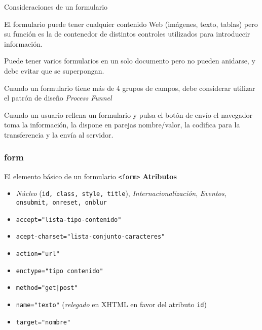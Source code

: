 \documentclass{beamer}
\begin{document}
\begin{frame}{Consideraciones de un formulario} %
    \begin{center}
        El formulario puede tener cualquier contenido Web (imágenes, texto,
        tablas) pero su función es la de contenedor de distintos controles
        utilizados para introduccir información. \\[0.4cm]
        \pause

        Puede tener varios formularios en un solo documento pero no pueden
        anidarse, y debe evitar que se superpongan. \\[0.4cm]
        \pause

        Cuando un formulario tiene más de 4 grupos de campos, debe considerar
        utilizar el patrón de diseño \textit{Process Funnel}\\[0.4cm]
        \pause

        Cuando un usuario rellena un formulario y pulsa el botón de envío el
        navegador toma la información,  la dispone en parejas nombre/valor, la
        codifica para la transferencia y la envía al servidor. 
    \end{center}
\end{frame}

\subsubsection{form} 

\begin{frame}{El elemento básico de un formulario \texttt{<form>} } %
    \textbf{Atributos}
    \begin{itemize}
        \item \textit{Núcleo} (\texttt{id, class, style, title}),
        \textit{Internacionalización}, \textit{Eventos}, \texttt{onsubmit,
        onreset, onblur}
        \item \texttt{accept="lista-tipo-contenido"}
        \item \texttt{acept-charset="lista-conjunto-caracteres"}
        \item \texttt{action="url"}
        \item \texttt{enctype="tipo contenido"}
        \item \texttt{method="get|post"}
        \item \texttt{name="texto"} (\textit{relegado} en XHTML en favor del
        atributo \texttt{id})
        \item \texttt{target="nombre"} 
    \end{itemize}
\end{frame}
\end{document}
